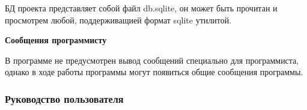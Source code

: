 БД проекта представляет собой файл db.sqlite, он может быть прочитан и просмотрем любой, поддерживащией формат sqlite утилитой.

\textbf{Сообщения программисту}

В программе не предусмотрен вывод сообщений специально для программиста, однако в ходе работы программы могут появиться
общие сообщения программы.

\subsubsection*{Руководство пользователя}
